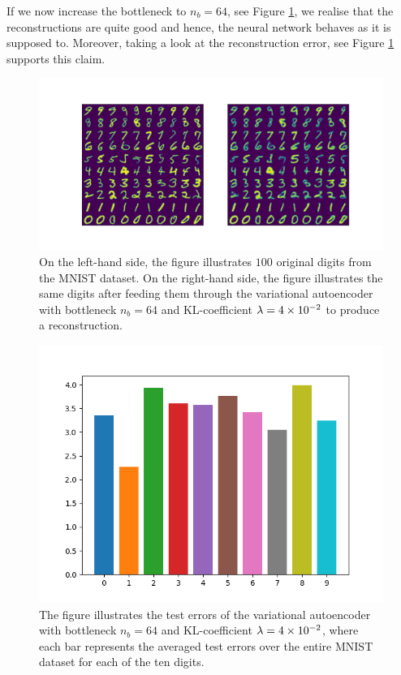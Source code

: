 If we now increase the bottleneck to $n_b=64$, see Figure \ref{fig:convolutional_VAE_snd_KL_4e-2_10k_epochs_64D_inference}, we realise that the reconstructions are quite good and hence, the neural network behaves as it is supposed to. Moreover, taking a look at the reconstruction error, see Figure \ref{fig:convolutional_VAE_snd_KL_4e-2_10k_epochs_64D_inference} supports this claim.

\begin{figure}
\begin{center}
      \includegraphics[trim = 15mm 10mm 15mm 15mm, clip, width=\linewidth]{convolutional_VAE_snd_KL_4e-2_10k_epochs_64D_inference}
\end{center}
\caption{On the left-hand side, the figure illustrates $100$ original digits from the MNIST dataset. On the right-hand side, the figure illustrates the same digits after feeding them through the variational autoencoder with bottleneck $n_b=64$ and KL-coefficient $\lambda=\num{4e-2}$ to produce a reconstruction.}\label{fig:convolutional_VAE_snd_KL_4e-2_10k_epochs_64D_inference}
\end{figure}

\begin{figure}
\begin{center}
      \includegraphics[width=0.55\linewidth]{convolutional_VAE_snd_KL_4e-2_10k_epochs_64D_errors}
\end{center}
\caption{The figure illustrates the test errors of the variational autoencoder with bottleneck $n_b=64$ and KL-coefficient $\lambda = \num{4e-2}$, where each bar represents the averaged test errors over the entire MNIST dataset for each of the ten digits.}\label{fig:convolutional_VAE_snd_KL_4e-2_10k_epochs_64D_errors}
\end{figure}


